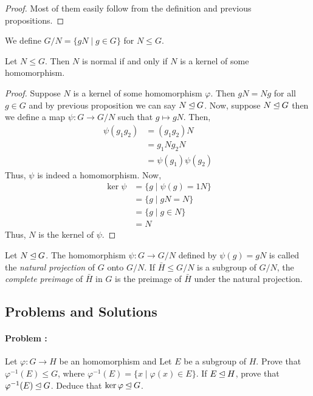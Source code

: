 \begin{proof}
    Most of them easily follow from the definition and previous propositions.
\end{proof}

\begin{definition}
    We define $G/N=\{gN \mid g \in G\}$ for $N \le G$.
\end{definition}

\begin{proposition}
    Let $N \le G$. Then $N$ is normal if and only if $N$ is a kernel of some homomorphism.
\end{proposition}

\begin{proof}
    Suppose $N$ is a kernel of some homomorphism $\varphi$. Then $gN = Ng$ for all $g \in G$ and by previous proposition we can say 
    $N \unlhd G$. Now, suppose $N \unlhd G$ then we define a map $\psi : G \to G/N$ such that $g \mapsto gN$.
    Then,
    \begin{align*}
        \psi(g_1 g_2) &= (g_1 g_2)N \\
        &= g_1 N g_2 N \\
        &= \psi(g_1) \psi(g_2)
    \end{align*}
    Thus, $\psi$ is indeed a homomorphism. Now,
    \begin{align*}
        \ker \psi &= \{ g \mid \psi(g) = 1 N\} \\
        &= \{ g \mid gN = N \} \\
        &= \{ g \mid g \in N\} \\
        &= N
    \end{align*}
    Thus, $N$ is the kernel of $\psi$.
\end{proof}

\begin{definition}
    Let $N \unlhd G$. The homomorphism $\psi : G \to G/N$ defined by $\psi(g)=gN$ is called the \textit{natural projection} of $G$ onto
    $G/N$. If $\bar{H} \le G/N$ is a subgroup of $G/N$, the \textit{complete preimage} of $\bar{H}$ in $G$ is the preimage of $\bar{H}$
    under the natural projection.
\end{definition}

\eject

\subsection*{Problems and Solutions}

\paragraph{Problem :} Let $\varphi : G \to H$ be an homomorphism and Let $E$ be a subgroup of $H$. Prove that $\varphi^{-1}(E) \le G$, where
$\varphi^{-1}(E) = \{x \mid \varphi(x) \in E\}$. If $E \unlhd H$, prove that $\varphi^{-1}(E) \unlhd G$. Deduce that $\ker \varphi 
\unlhd G$. 

